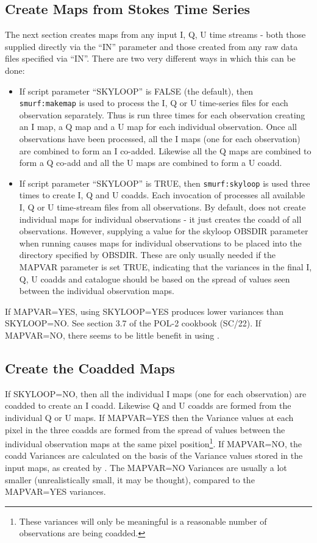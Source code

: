 \documentclass[twoside,11pt]{starlink}
\begin{document}
\subsection{Create Maps from Stokes Time Series\label{se:maps}}
The next section creates maps from any input I, Q, U time streams - both
those supplied directly via the ``IN'' parameter and those created from
any raw  data files specified via ``IN''. There are two very different
ways in which this can be done:
\begin{itemize}
\item If script parameter ``SKYLOOP'' is FALSE (the default), then
\texttt{smurf:makemap} is used to process the I, Q or U time-series files
for each observation separately. Thus \mmap is run three times
for each observation creating an I map, a Q map and a U map for each
individual observation. Once all observations have been processed, all the
I maps (one for each observation) are combined to form an I co-added.
Likewise all the Q maps are combined to form a Q co-add and all the U
maps are combined to form a U coadd.
\item If script parameter ``SKYLOOP'' is TRUE, then \texttt{smurf:skyloop}
is used three times to create I, Q and U coadds. Each invocation of
\sloop processes all available I, Q or U time-stream files from
all observations. By default, \sloop does not create individual
maps for individual observations - it just creates the coadd of all
observations. However, supplying a value for the skyloop OBSDIR parameter when
running \sloop causes maps for individual observations to be
placed into the directory specified by OBSDIR. These are only usually
needed if the \ptmap MAPVAR parameter is set TRUE, indicating
that the variances in the final I, Q, U coadds and catalogue should be
based on the spread of values seen between the individual observation maps.
\end{itemize}
If MAPVAR=YES, using SKYLOOP=YES produces lower variances than
SKYLOOP=NO. See section 3.7 of the POL-2 cookbook (SC/22). If MAPVAR=NO,
there seems to be little benefit in using \sloop.
\subsection{Create the Coadded Maps}
If SKYLOOP=NO, then all the individual I maps (one for each observation)
are coadded to create an I coadd. Likewise Q and U coadds are formed from
the individual Q or U maps. If MAPVAR=YES then the Variance values at each
pixel in the
three coadds are formed from the spread of values between the individual
observation maps at the same pixel position\footnote{These variances will
only be meaningful is a reasonable number of observations are being
coadded.}. If MAPVAR=NO, the coadd Variances are calculated on the basis
of the Variance values stored in the input maps, as created by
\mmap. The MAPVAR=NO Variances are usually a lot smaller
(unrealistically small, it may be thought), compared to the MAPVAR=YES
variances.
\end{document}
